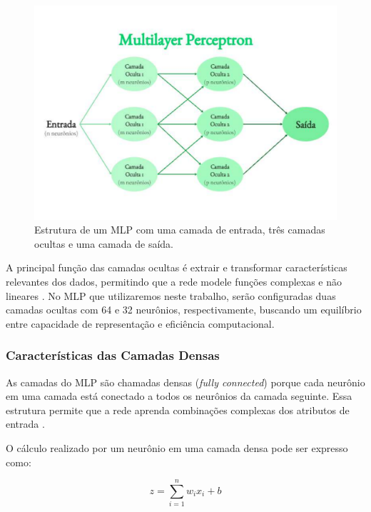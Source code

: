 \begin{figure}[h]
    \captionsetup{font=footnotesize, position=above}
    \caption{Estrutura de um MLP com uma camada de entrada, três camadas ocultas e uma camada de saída.}
    \label{fig:biopsiaPGT-A}
    \centering
    \includegraphics[scale=0.35]{figuras/multilayer.pdf}
    \vspace{0.3cm}
\end{figure}
\FloatBarrier

A principal função das camadas ocultas é extrair e transformar características relevantes dos dados, permitindo que a rede modele funções complexas e não lineares \cite{haykin2009}. No MLP que utilizaremos neste trabalho, serão configuradas duas camadas ocultas com 64 e 32 neurônios, respectivamente, buscando um equilíbrio entre capacidade de representação e eficiência computacional.

\subsubsection{Características das Camadas Densas}

As camadas do MLP são chamadas densas (\textit{fully connected}) porque cada neurônio em uma camada está conectado a todos os neurônios da camada seguinte. Essa estrutura permite que a rede aprenda combinações complexas dos atributos de entrada \cite{goodfellow2016}.

O cálculo realizado por um neurônio em uma camada densa pode ser expresso como:

\begin{equation}
    z = \sum_{i=1}^{n} w_i x_i + b
\end{equation}

